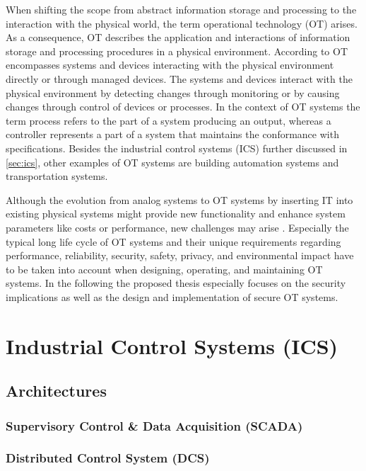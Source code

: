 When shifting the scope from abstract information storage and processing to the interaction with the physical world, the term operational technology (OT) arises.
As a consequence, OT describes the application and interactions of information storage and processing procedures in a physical environment.
According to \citeauthor{Stouffer2023} \cite{Stouffer2023} OT encompasses systems and devices interacting with the physical environment directly or through managed devices.
The systems and devices interact with the physical environment by detecting changes through monitoring or by causing changes through control of devices or processes.
In the context of OT systems the term process refers to the part of a system producing an output, whereas a controller represents a part of a system that maintains the conformance with specifications.
Besides the industrial control systems (ICS) further discussed in \autoref{sec:ics}, other examples of OT systems are building automation systems and transportation systems.

Although the evolution from analog systems to OT systems by inserting IT into existing physical systems might provide new functionality and enhance system parameters like costs or performance, new challenges may arise \cite{Stouffer2023}.
Especially the typical long life cycle of OT systems and their unique requirements regarding performance, reliability, security, safety, privacy, and environmental impact have to be taken into account when designing, operating, and maintaining OT systems.
In the following the proposed thesis especially focuses on the security implications as well as the design and implementation of secure OT systems.

\section{Industrial Control Systems (ICS)}
\label{sec:ics}

\subsection{Architectures}
\subsubsection{Supervisory Control \& Data Acquisition (SCADA)}
\subsubsection{Distributed Control System (DCS)}

